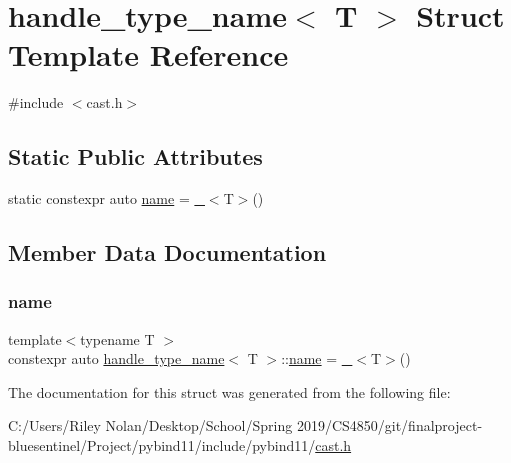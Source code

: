\hypertarget{structhandle__type__name}{}\section{handle\+\_\+type\+\_\+name$<$ T $>$ Struct Template Reference}
\label{structhandle__type__name}


{\ttfamily \#include $<$cast.\+h$>$}

\subsection*{Static Public Attributes}
\begin{DoxyCompactItemize}
\item 
static constexpr auto \mbox{\hyperlink{structhandle__type__name_a9ace4a88e712e773a4859e0302714baa}{name}} = \mbox{\hyperlink{descr_8h_af114703e20c6527e87163eb2798f74b8}{\+\_\+}}$<$T$>$()
\end{DoxyCompactItemize}


\subsection{Member Data Documentation}
\mbox{\label{structhandle__type__name_a9ace4a88e712e773a4859e0302714baa}} 
\subsubsection{\texorpdfstring{name}{name}}
{\footnotesize\ttfamily template$<$typename T $>$ \\
constexpr auto \mbox{\hyperlink{structhandle__type__name}{handle\+\_\+type\+\_\+name}}$<$ T $>$\+::\mbox{\hyperlink{structname}{name}} = \mbox{\hyperlink{descr_8h_af114703e20c6527e87163eb2798f74b8}{\+\_\+}}$<$T$>$()\hspace{0.3cm}{\ttfamily [static]}}



The documentation for this struct was generated from the following file\+:\begin{DoxyCompactItemize}
\item 
C\+:/\+Users/\+Riley Nolan/\+Desktop/\+School/\+Spring 2019/\+C\+S4850/git/finalproject-\/bluesentinel/\+Project/pybind11/include/pybind11/\mbox{\hyperlink{cast_8h}{cast.\+h}}\end{DoxyCompactItemize}
